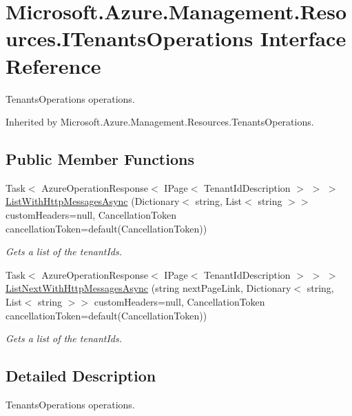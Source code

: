 \hypertarget{interface_microsoft_1_1_azure_1_1_management_1_1_resources_1_1_i_tenants_operations}{}\section{Microsoft.\+Azure.\+Management.\+Resources.\+I\+Tenants\+Operations Interface Reference}
\label{interface_microsoft_1_1_azure_1_1_management_1_1_resources_1_1_i_tenants_operations}


Tenants\+Operations operations.  




Inherited by Microsoft.\+Azure.\+Management.\+Resources.\+Tenants\+Operations.

\subsection*{Public Member Functions}
\begin{DoxyCompactItemize}
\item 
Task$<$ Azure\+Operation\+Response$<$ I\+Page$<$ Tenant\+Id\+Description $>$ $>$ $>$ \hyperlink{interface_microsoft_1_1_azure_1_1_management_1_1_resources_1_1_i_tenants_operations_a51138e59d5283eb04f7f91da7768d097}{List\+With\+Http\+Messages\+Async} (Dictionary$<$ string, List$<$ string $>$$>$ custom\+Headers=null, Cancellation\+Token cancellation\+Token=default(Cancellation\+Token))
\begin{DoxyCompactList}\small\item\em Gets a list of the tenant\+Ids. \end{DoxyCompactList}\item 
Task$<$ Azure\+Operation\+Response$<$ I\+Page$<$ Tenant\+Id\+Description $>$ $>$ $>$ \hyperlink{interface_microsoft_1_1_azure_1_1_management_1_1_resources_1_1_i_tenants_operations_a6ba6190af36a4e5a74725dd2f7f21198}{List\+Next\+With\+Http\+Messages\+Async} (string next\+Page\+Link, Dictionary$<$ string, List$<$ string $>$$>$ custom\+Headers=null, Cancellation\+Token cancellation\+Token=default(Cancellation\+Token))
\begin{DoxyCompactList}\small\item\em Gets a list of the tenant\+Ids. \end{DoxyCompactList}\end{DoxyCompactItemize}


\subsection{Detailed Description}
Tenants\+Operations operations. 



